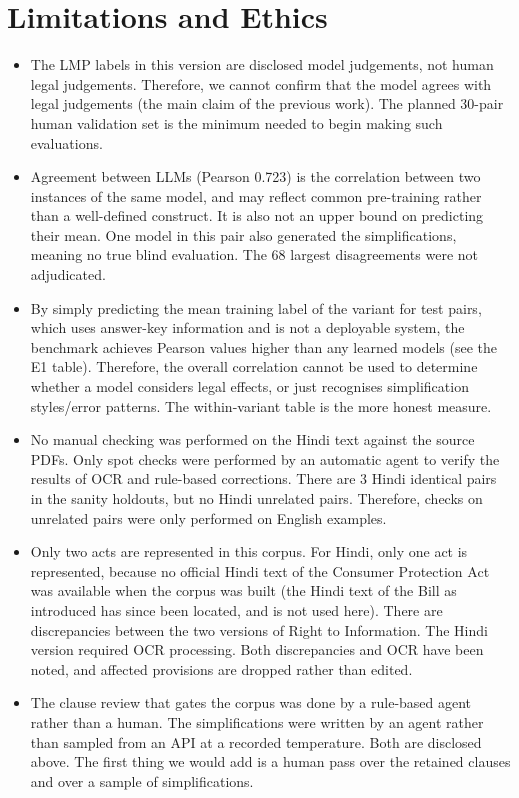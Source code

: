 \documentclass[conference]{IEEEtran}
\begin{document}
\section{Limitations and Ethics}

\begin{itemize}
\item The LMP labels in this version are disclosed model judgements, not human legal judgements. Therefore, we cannot confirm that the model agrees with legal judgements (the main claim of the previous work). The planned 30-pair human validation set is the minimum needed to begin making such evaluations.
\item Agreement between LLMs (Pearson 0.723) is the correlation between two instances of the same model, and may reflect common pre-training rather than a well-defined construct. It is also not an upper bound on predicting their mean. One model in this pair also generated the simplifications, meaning no true blind evaluation. The 68 largest disagreements were not adjudicated.
\item By simply predicting the mean training label of the variant for test pairs, which uses answer-key information and is not a deployable system, the benchmark achieves Pearson values higher than any learned models (see the E1 table). Therefore, the overall correlation cannot be used to determine whether a model considers legal effects, or just recognises simplification styles/error patterns. The within-variant table is the more honest measure.
\item No manual checking was performed on the Hindi text against the source PDFs. Only spot checks were performed by an automatic agent to verify the results of OCR and rule-based corrections. There are 3 Hindi identical pairs in the sanity holdouts, but no Hindi unrelated pairs. Therefore, checks on unrelated pairs were only performed on English examples.
\item Only two acts are represented in this corpus. For Hindi, only one act is represented, because no official Hindi text of the Consumer Protection Act was available when the corpus was built (the Hindi text of the Bill as introduced has since been located, and is not used here). There are discrepancies between the two versions of Right to Information. The Hindi version required OCR processing. Both discrepancies and OCR have been noted, and affected provisions are dropped rather than edited.
\item The clause review that gates the corpus was done by a rule-based agent rather than a human. The simplifications were written by an agent rather than sampled from an API at a recorded temperature. Both are disclosed above. The first thing we would add is a human pass over the retained clauses and over a sample of simplifications.

\end{itemize}
\end{document}

